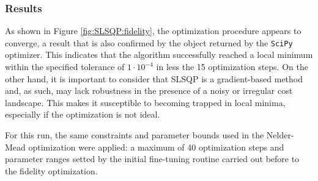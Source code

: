 \subsubsection{Results}
As shown in Figure \ref{fig:SLSQP:fidelity}, the optimization procedure appears to converge, a result that is also confirmed by the object returned by the \texttt{SciPy} optimizer.
This indicates that the algorithm successfully reached a local minimum within the specified tolerance of $1\cdot10^{-4}$ in less the 15 optimization steps. On the other hand, it is important to consider that SLSQP is a gradient-based method and, as such, may lack robustness in the presence of a noisy or irregular cost landscape.
This makes it susceptible to becoming trapped in local minima, especially if the optimization is not ideal.

For this run, the same constraints and parameter bounds used in the Nelder-Mead optimization were applied: a maximum of 40 optimization steps and parameter ranges setted by the initial fine-tuning routine carried out before to the fidelity optimization.

